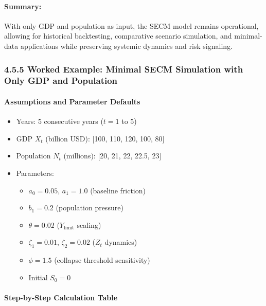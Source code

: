 \documentclass[12pt]{report}
\begin{document}
\paragraph{Summary:} With only GDP and population as input, the SECM model remains operational, allowing for historical backtesting, comparative scenario simulation, and minimal-data applications while preserving systemic dynamics and risk signaling.

\subsubsection{4.5.5 Worked Example: Minimal SECM Simulation with Only GDP and Population}

\paragraph{Assumptions and Parameter Defaults}
\begin{itemize}
    \item Years: 5 consecutive years ($t = 1$ to $5$)
    \item GDP $X_t$ (billion USD): [100, 110, 120, 100, 80]
    \item Population $N_t$ (millions): [20, 21, 22, 22.5, 23]
    \item Parameters:
    \begin{itemize}
        \item $a_0 = 0.05$, $a_1 = 1.0$ \quad (baseline friction)
        \item $b_1 = 0.2$ \quad (population pressure)
        \item $\theta = 0.02$ \quad ($Y_{\text{limit}}$ scaling)
        \item $\zeta_1 = 0.01$, $\zeta_2 = 0.02$ \quad ($Z_t$ dynamics)
        \item $\phi = 1.5$ \quad (collapse threshold sensitivity)
        \item Initial $S_0 = 0$
    \end{itemize}
\end{itemize}

\paragraph{Step-by-Step Calculation Table}
\end{document}
